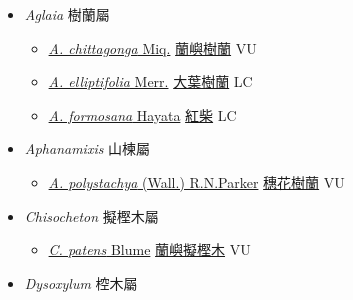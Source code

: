 
  \begin{itemize}
 \item[] \textit{Aglaia} 樹蘭屬
                    
  \begin{itemize}
        \item[] \href{http://www.theplantlist.org/tpl1.1/search?q=Aglaia+chittagonga}{\textit{A. chittagonga} Miq.}   \href{\detokenize{http://taibnet.sinica.edu.tw/chi/taibnet_species_list.php?T2=蘭嶼樹蘭&T2_new_value=true&fr=y}}{蘭嶼樹蘭} VU
        \item[] \href{http://www.theplantlist.org/tpl1.1/search?q=Aglaia+elliptifolia}{\textit{A. elliptifolia} Merr.}   \href{\detokenize{http://taibnet.sinica.edu.tw/chi/taibnet_species_list.php?T2=大葉樹蘭&T2_new_value=true&fr=y}}{大葉樹蘭} LC
        \item[] \href{http://www.theplantlist.org/tpl1.1/search?q=Aglaia+formosana}{\textit{A. formosana} Hayata}   \href{\detokenize{http://taibnet.sinica.edu.tw/chi/taibnet_species_list.php?T2=紅柴&T2_new_value=true&fr=y}}{紅柴} LC
  \end{itemize}
 \item[] \textit{Aphanamixis} 山楝屬
                    
  \begin{itemize}
        \item[] \href{http://www.theplantlist.org/tpl1.1/search?q=Aphanamixis+polystachya}{\textit{A. polystachya} (Wall.) R.N.Parker}   \href{\detokenize{http://taibnet.sinica.edu.tw/chi/taibnet_species_list.php?T2=穗花樹蘭&T2_new_value=true&fr=y}}{穗花樹蘭} VU
  \end{itemize}
 \item[] \textit{Chisocheton} 擬樫木屬
                    
  \begin{itemize}
        \item[] \href{http://www.theplantlist.org/tpl1.1/search?q=Chisocheton+patens}{\textit{C. patens} Blume}   \href{\detokenize{http://taibnet.sinica.edu.tw/chi/taibnet_species_list.php?T2=蘭嶼擬樫木&T2_new_value=true&fr=y}}{蘭嶼擬樫木} VU
  \end{itemize}
 \item[] \textit{Dysoxylum} 椌木屬
                    

\end{itemize}

